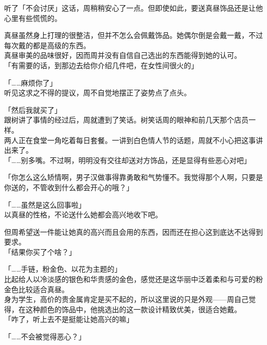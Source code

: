 听了「不会讨厌」这话，周稍稍安心了一点。但即使如此，要送真昼饰品还是让他心里有些慌慌的。

真昼虽然身上打理的很整洁，但并不怎么会佩戴饰品。她偶尔倒是会戴一戴，不过每次戴的都是高级的东西。\\

真昼审美的品味很好，因而周并没有自信自己选出的东西能得到她的认可。\\

「有需要的话，到那边去给你介绍几件吧，在女性间很火的」

「……麻烦你了」\\

听见这求之不得的提议，周不自觉地摆正了姿势点了点头。\\

\vspace{2\baselineskip}

「然后我就买了」\\

跟树讲了事情的经过后，周就遭到了笑话。树笑话周的眼神和前几天那个店员一样。\\

两人正在食堂一角吃着每日套餐。一讲到白色情人节的话题，周就不小心把这事讲出来了。\\

「……别多嘴。不过啊，明明没有交往却送对方饰品，还是显得有些恶心对吧」

「你怎么这么矫情啊，男子汉做事得靠勇敢和气势懂不。我觉得那个人啊，只要是你送的，不管收到什么都会开心的哦？」

「……虽然是这么回事啦」\\

以真昼的性格，不论送什么她都会高兴地收下吧。

但周希望送一件能让她真的高兴而且会用的东西，因而还在担心这到底达不达得到要求。\\

「结果你买了个啥？」

「……手链，粉金色、以花为主题的」\\

比起给人以冷淡感的银色和华贵感的金色，感觉还是这华丽中泛着柔和与可爱的粉金色比较适合真昼。\\

身为学生，高价的贵金属肯定是买不起的，所以这里说的只是外观——周自己觉得，在这种颜色的饰品中，他挑选出的这一款设计精致优美，很适合她戴。\\

「咋了，听上去不是挺能让她高兴的嘛」

「……不会被觉得恶心？」

